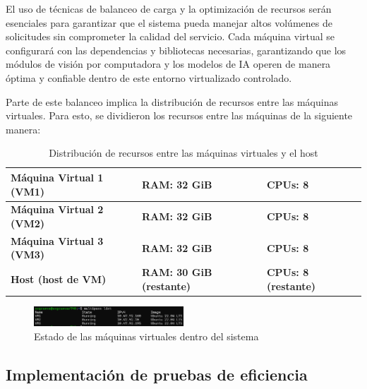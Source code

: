 El uso de técnicas de balanceo de carga y la optimización de recursos serán esenciales para garantizar que el sistema pueda manejar altos volúmenes de solicitudes sin comprometer la calidad del servicio. Cada máquina virtual se configurará con las dependencias y bibliotecas necesarias, garantizando que los módulos de visión por computadora y los modelos de IA operen de manera óptima y confiable dentro de este entorno virtualizado controlado.

Parte de este balanceo implica la distribución de recursos entre las máquinas virtuales. Para esto, se dividieron los recursos entre las máquinas de la siguiente manera:

\renewcommand{\arraystretch}{1.3} %
\begin{table}[H]
\centering
\begin{tabularx}{\textwidth}{|m{4.5cm}|m{4cm}|X|}
\hline
\textbf{Máquina Virtual 1 (VM1)} & \textbf{RAM: 32 GiB} & \textbf{CPUs: 8} \\ \hline
\textbf{Máquina Virtual 2 (VM2)} & \textbf{RAM: 32 GiB} & \textbf{CPUs: 8} \\ \hline
\textbf{Máquina Virtual 3 (VM3)} & \textbf{RAM: 32 GiB} & \textbf{CPUs: 8} \\ \hline
\textbf{Host (host de VM)} & \textbf{RAM: 30 GiB (restante)} & \textbf{CPUs: 8 (restante)} \\ \hline
\end{tabularx}
\caption{Distribución de recursos entre las máquinas virtuales y el host}
\label{tab:vm_resources}
\end{table}

\vspace{0.5cm}

\begin{figure}[H]
    \centering
    \includegraphics[width=0.5\textwidth]{figuras/EstadosVMs.png}
    \caption{Estado de las máquinas virtuales dentro del sistema}
    \label{fig:EstadosVMs}
\end{figure}

\subsection{Implementación de pruebas de eficiencia}

